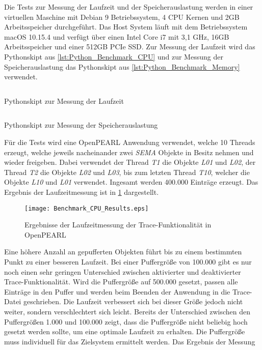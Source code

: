 Die Tests zur Messung der Laufzeit und der Speicherauslastung werden in einer
virtuellen Maschine mit Debian 9 Betriebssystem, 4 CPU Kernen und 2GB
Arbeitsspeicher durchgeführt. Das Host System läuft mit dem Betriebssystem macOS
10.15.4 und verfügt über einen Intel Core i7 mit 3,1 GHz, 16GB Arbeitsspeicher
und einer 512GB PCIe SSD. Zur Messung der Laufzeit wird das Pythonskipt aus
\cref{lst:Python_Benchmark_CPU} und zur Messung der Speicherauslastung das
Pythonskipt aus \cref{lst:Python_Benchmark_Memory} verwendet.
\begin{listing}[ht]
  \inputminted[frame=lines,linenos]{python}{./Python/benchmark_cpu.py}
  \caption{Pythonskipt zur Messung der Laufzeit}
  \label{lst:Python_Benchmark_CPU}
\end{listing} 
\begin{listing}[ht]
  \inputminted[frame=lines,linenos]{python}{./Python/benchmark_memory.py}
  \caption{Pythonskipt zur Messung der Speicherauslastung}
  \label{lst:Python_Benchmark_Memory}
\end{listing}
Für die Tests wird eine OpenPEARL Anwendung verwendet, welche 10 Threads
erzeugt, welche jeweils nacheinander zwei \emph{SEMA} Objekte in Besitz nehmen
und wieder freigeben. Dabei verwendet der Thread \emph{T1} die Objekte
\emph{L01} und \emph{L02}, der Thread \emph{T2} die Objekte \emph{L02}
und \emph{L03}, bis zum letzten Thread \emph{T10}, welcher die Objekte
\emph{L10} und \emph{L01} verwendet. Ingesamt werden 400.000 Einträge erzeugt.
Das Ergebnis der Laufzeitmessung ist in \cref{fig:BenchmarkCpuResults}
dargestellt. 
\begin{figure}[ht]
  \texttt{[image: Benchmark\_CPU\_Results.eps]}
  \caption{Ergebnisse der Laufzeitmessung der Trace-Funktionalität in OpenPEARL}
  \label{fig:BenchmarkCpuResults}
\end{figure}
Eine höhere Anzahl an gepufferten Objekten führt bis zu einem bestimmten Punkt
zu einer besseren Laufzeit. Bei einer Puffergröße von 100.000 gibt es nur noch
einen sehr geringen Unterschied zwischen aktivierter und deaktivierter
Trace-Funktionalität. Wird die Puffergröße auf 500.000 gesetzt, passen alle
Einträge in den Puffer und werden beim Beenden der Anwendung in die Trace-Datei
geschrieben. Die Laufzeit verbessert sich bei dieser Größe jedoch nicht weiter,
sondern verschlechtert sich leicht. Bereits der Unterschied zwischen den
Puffergrößen 1.000 und 100.000 zeigt, dass die Puffergröße nicht beliebig hoch
gesetzt werden sollte, um eine optimale Laufzeit zu erhalten. Die Puffergröße
muss individuell für das Zielsystem ermittelt werden. Das Ergebnis der Messung
